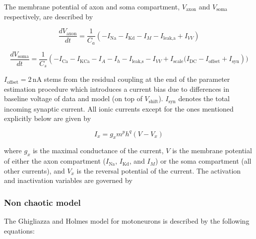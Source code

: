 The membrane potential of axon and soma compartment, $V_{\text{axon}}$ and $V_{\text{soma}}$ respectively, are described by

\begin{equation}
	\frac{dV_{\text{axon}}}{dt} = \frac{1}{C_a} \left( -I_{\text{Na}} - I_{\text{Kd}} - I_M - I_{\text{leak,a}} + I_{VV} \right)
\end{equation}

\begin{equation}
	\frac{dV_{\text{soma}}}{dt} = \frac{1}{C_s} \left( -I_{\text{Ca}} - I_{\text{KCa}} - I_A - I_h - I_{\text{leak,s}} - I_{VV} + I_{\text{scale}} (I_{\text{DC}} - I_{\text{offset}} + I_{\text{syn}} \right))
\end{equation}

$I_{\text{offset}} = 2 \, \text{nA}$ stems from the residual coupling at the end of the parameter estimation procedure which introduces a current bias due to differences in baseline voltage of data and model (on top of $V_{\text{shift}}$). $I_{\text{syn}}$ denotes the total incoming synaptic current. All ionic currents except for the ones mentioned explicitly below are given by

\begin{equation}
	I_x = g_x m^p h^q (V - V_x)
\end{equation}

where $g_x$ is the maximal conductance of the current, $V$ is the membrane potential of either the axon compartment ($I_{\text{Na}}$, $I_{\text{Kd}}$, and $I_M$) or the soma compartment (all other currents), and $V_x$ is the reversal potential of the current. The activation and inactivation variables are governed by

%
%
%

\subsubsection{Non chaotic model \cite{ghigliazza_minimal_2004}}
The Ghigliazza and Holmes model for motoneurons is described by the following equations:

